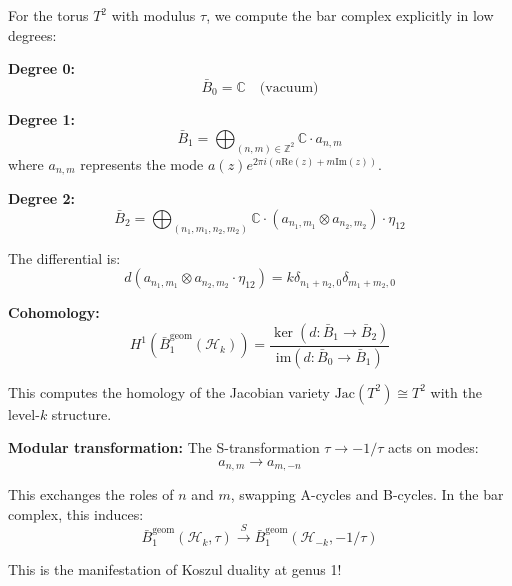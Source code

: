 \begin{example}\label{ex:heisenberg-genus1-explicit}
For the torus $T^2$ with modulus $\tau$, we compute the bar complex explicitly in low degrees:

\textbf{Degree 0:}
$$\bar{B}_0 = \mathbb{C} \quad \text{(vacuum)}$$

\textbf{Degree 1:}
$$\bar{B}_1 = \bigoplus_{(n,m) \in \mathbb{Z}^2} \mathbb{C} \cdot a_{n,m}$$
where $a_{n,m}$ represents the mode $a(z) e^{2\pi i(n\text{Re}(z) + m\text{Im}(z))}$.

\textbf{Degree 2:}
$$\bar{B}_2 = \bigoplus_{(n_1,m_1,n_2,m_2)} \mathbb{C} \cdot (a_{n_1,m_1} \otimes a_{n_2,m_2}) \cdot \eta_{12}$$

The differential is:
$$d(a_{n_1,m_1} \otimes a_{n_2,m_2} \cdot \eta_{12}) = k\delta_{n_1+n_2,0} \delta_{m_1+m_2,0}$$

\textbf{Cohomology:}
$$H^1(\bar{B}^{\text{geom}}_1(\mathcal{H}_k)) = \frac{\ker(d: \bar{B}_1 \to \bar{B}_2)}{\text{im}(d: \bar{B}_0 \to \bar{B}_1)}$$

This computes the homology of the Jacobian variety $\text{Jac}(T^2) \cong T^2$ with the level-$k$ structure.

\textbf{Modular transformation:} The S-transformation $\tau \to -1/\tau$ acts on modes:
$$a_{n,m} \to a_{m,-n}$$

This exchanges the roles of $n$ and $m$, swapping A-cycles and B-cycles. In the bar complex, this induces:
$$\bar{B}^{\text{geom}}_1(\mathcal{H}_k, \tau) \xrightarrow{S} \bar{B}^{\text{geom}}_1(\mathcal{H}_{-k}, -1/\tau)$$

This is the manifestation of Koszul duality at genus 1!
\end{example}

